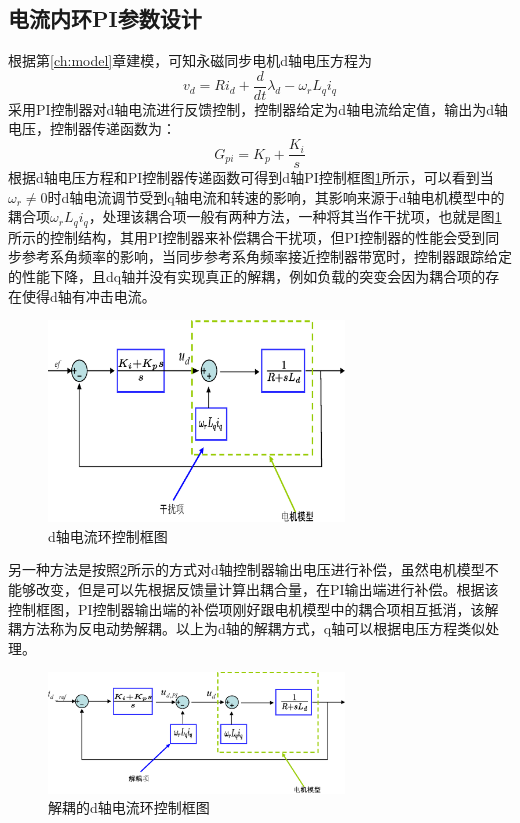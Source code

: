 \subsection{电流内环PI参数设计}
根据第\ref{ch:model}章建模，可知永磁同步电机d轴电压方程为
\begin{equation}\label{eq:voltage_d}
v_{d}=Ri_{d}+\frac{d}{dt}\lambda_{d}-\omega_{r}L_{q}i_{q}
\end{equation}
采用PI控制器对d轴电流进行反馈控制，控制器给定为d轴电流给定值，输出为d轴电压，控制器传递函数为：
\begin{equation}\label{eq:PI_controller}
	G_{pi}=K_{p}+\frac{K_{i}}{s}
\end{equation}
根据d轴电压方程和PI控制器传递函数可得到d轴PI控制框图\ref{fig:d_PI}所示，可以看到当$\omega_{r}\neq0$时d轴电流调节受到q轴电流和转速的影响，其影响来源于d轴电机模型中的耦合项$\omega_{r}L_{q}i_{q}$，处理该耦合项一般有两种方法，一种将其当作干扰项，也就是图\ref{fig:d_PI}所示的控制结构，其用PI控制器来补偿耦合干扰项，但PI控制器的性能会受到同步参考系角频率的影响，当同步参考系角频率接近控制器带宽时，控制器跟踪给定的性能下降\cite{briz2000analysis}，且dq轴并没有实现真正的解耦，例如负载的突变会因为耦合项的存在使得d轴有冲击电流。
\begin{figure}[H]
	\centering
	\includegraphics[width=0.7\textwidth]{figs/d_PI.eps}
	\caption{d轴电流环控制框图}
	\label{fig:d_PI}
\end{figure}
另一种方法是按照\ref{fig:d_PI_decoupled}所示的方式对d轴控制器输出电压进行补偿，虽然电机模型不能够改变，但是可以先根据反馈量计算出耦合量，在PI输出端进行补偿。根据该控制框图，PI控制器输出端的补偿项刚好跟电机模型中的耦合项相互抵消，该解耦方法称为反电动势解耦。以上为d轴的解耦方式，q轴可以根据电压方程类似处理。
\begin{figure}[H]
	\centering
	\includegraphics[width=0.7\textwidth]{figs/d_PI_decoupled.eps}
	\caption{解耦的d轴电流环控制框图}
	\label{fig:d_PI_decoupled}
\end{figure}
